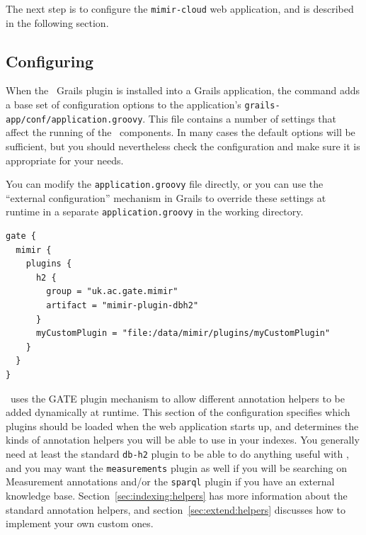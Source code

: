 The next step is to configure the {\tt mimir-cloud} web application, and is
described in the following section.

\subsection{Configuring}\label{sec:admin:config}

When the \Mimir\ Grails plugin is installed into a Grails application, the
 command adds a base set of configuration
options to the application's {\tt grails-app/conf/application.groovy}.
This file contains a number of settings that affect the running of the \Mimir\
components. In many cases the default options will be sufficient, but you should
nevertheless check the configuration and make sure it is appropriate for your
needs.

You can modify the {\tt application.groovy} file directly, or you can use the
``external configuration'' mechanism in Grails to override these settings at
runtime in a separate {\tt application.groovy} in the working directory.

\begin{lstlisting}
gate {
  mimir {
    plugins {
      h2 {
        group = "uk.ac.gate.mimir"
        artifact = "mimir-plugin-dbh2"
      }
      myCustomPlugin = "file:/data/mimir/plugins/myCustomPlugin"
    }
  }
}
\end{lstlisting}

\Mimir\ uses the GATE plugin mechanism to allow different annotation helpers to
be added dynamically at runtime.  This section of the configuration specifies
which plugins should be loaded when the web application starts up, and
determines the kinds of annotation helpers you will be able to use in your
indexes.  You generally need at least  the standard {\tt db-h2} plugin to be
able to do anything useful with \Mimir, and you may want the {\tt measurements}
plugin as well if you will be searching on Measurement annotations and/or the
{\tt sparql} plugin if you have an external knowledge base. 
Section~\ref{sec:indexing:helpers} has more information about the standard
annotation helpers, and section~\ref{sec:extend:helpers} discusses how to
implement your own custom ones.


